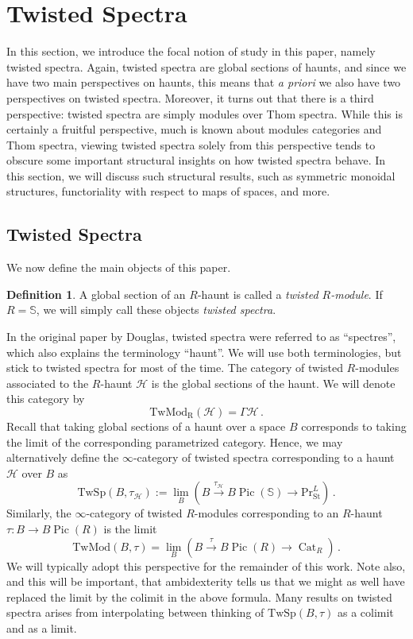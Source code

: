 \documentclass[10pt]{amsart}
\newcommand{\longto}{\longrightarrow}
\theoremstyle{plain}
\theoremstyle{definition}
\newtheorem{definition}[theorem]{Definition}
\DeclareMathOperator{\Pic}{Pic}
\DeclareMathOperator{\Cat}{Cat}
\newcommand{\St}{\mathrm{St}}
\newcommand{\bS}{\mathbb{S}}
\newcommand{\cH}{\mathcal{H}}
\newcommand{\TwSp}{\mathrm{TwSp}}
\begin{document}
\section{Twisted Spectra}

In this section, we introduce the focal notion of study in this paper, namely twisted spectra.
Again, twisted spectra are global sections of haunts, and since we have two main perspectives on haunts, this means that \emph{a priori} we also have two perspectives on twisted spectra.
Moreover, it turns out that there is a third perspective: twisted spectra are simply modules over Thom spectra.
While this is certainly a fruitful perspective, much is known about modules categories and Thom spectra, viewing twisted spectra solely from this perspective tends to obscure some important structural insights on how twisted spectra behave.
In this section, we will discuss such structural results, such as symmetric monoidal structures, functoriality with respect to maps of spaces, and more.

\subsection{Twisted Spectra}

We now define the main objects of this paper.

\begin{definition}
  A global section of an $R$-haunt is called a \emph{twisted $R$-module}. If $R = \bS$, we will simply call these objects \emph{twisted spectra}.
\end{definition}

In the original paper by Douglas, twisted spectra were referred to as ``spectres'', which also explains the terminology ``haunt''.
We will use both terminologies, but stick to twisted spectra for most of the time.
The category of twisted $R$-modules associated to the $R$-haunt $\mathcal{H}$ is the global sections of the haunt.
We will denote this category by
\[
\mathrm{TwMod_R}(\cH) = \Gamma \cH \,.
\]
Recall that taking global sections of a haunt over a space $B$ corresponds to taking the limit of the corresponding parametrized category.
Hence, we may alternatively define the $\infty$-category of twisted spectra corresponding to a haunt $\mathcal{H}$ over $B$ as
$$
\TwSp(B,\tau_{\cH}) := \lim_{B}(B \overset{\tau_{\cH}}\longto B\Pic(\bS) \longto \mathrm{Pr}^L_{\St}) \,.
$$
Similarly, the $\infty$-category of twisted $R$-modules corresponding to an $R$-haunt $\tau : B \to B\Pic(R) $ is the limit
\[
\mathrm{TwMod}(B,\tau) = \lim_{B}(B \overset{\tau}\longto B\Pic(R) \longto \Cat_R) \,.
\]
We will typically adopt this perspective for the remainder of this work.
Note also, and this will be important, that ambidexterity tells us that we might as well have replaced the limit by the colimit in the above formula.
Many results on twisted spectra arises from interpolating between thinking of $\TwSp(B,\tau)$ as a colimit and as a limit.
\end{document}
